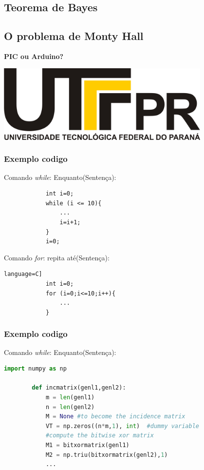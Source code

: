 \documentclass[t]{beamer}
\begin{document}
\subsection{Teorema de Bayes}
\begin{frame}[c]


\end{frame}

\subsection{O problema de Monty Hall}
\begin{frame}[c]


\end{frame}
\begin{frame}[c]
	\textbf{PIC ou Arduino?}
	\newline

	\begin{center}
		\includegraphics[width=0.8\textwidth]{images/logo.jpg}
	\end{center}
\end{frame}

\begin{frame}[fragile]
	\frametitle{Exemplo codigo}
		Comando \textit{while}: Enquanto(Sentença):
		\begin{lstlisting}
			int i=0;
			while (i <= 10){
				...
				i=i+1;
			}
			i=0;
		\end{lstlisting}
			Comando \textit{for}: repita até(Sentença):
		\begin{lstlisting}language=C]
			int i=0;
			for (i=0;i<=10;i++){
				...
			}
		\end{lstlisting}
\end{frame}

\begin{frame}[fragile]
	\frametitle{Exemplo codigo}
	Comando \textit{while}: Enquanto(Sentença):

	\begin{lstlisting}[language=Python]
		import numpy as np
		
		def incmatrix(genl1,genl2):
			m = len(genl1)
			n = len(genl2)
			M = None #to become the incidence matrix
			VT = np.zeros((n*m,1), int)  #dummy variable
			#compute the bitwise xor matrix
			M1 = bitxormatrix(genl1)
			M2 = np.triu(bitxormatrix(genl2),1) 
			... 
	\end{lstlisting}
\end{frame}
\end{document}

